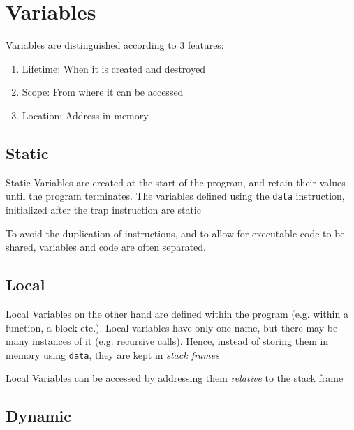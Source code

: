 \documentclass[english,course]{Notes}
\newcommand{\ita}[1]{\textit{#1}}
\newcommand{\code}{\texttt}
\begin{document}
\section{Variables}

\par{Variables are distinguished according to 3 features:}
\begin{enumerate}
	\item Lifetime: When it is created and destroyed
	\item Scope: From where it can be accessed
	\item Location: Address in memory
\end{enumerate}

\subsection{Static}

\par{Static Variables are created at the start of the program, and retain their values until the program terminates. The variables defined using the \code{data} instruction, initialized after the trap instruction are static}

\par{To avoid the duplication of instructions, and to allow for executable code to be shared, variables and code are often separated.}


\subsection{Local}

\par{Local Variables on the other hand are defined within the program (e.g. within a function, a block etc.). Local variables have only one name, but there may be many instances of it (e.g. recursive calls). Hence, instead of storing them in memory using \code{data}, they are kept in \ita{stack frames}}

\par{Local Variables can be accessed by addressing them \ita{relative} to the stack frame}

\subsection{Dynamic}
\end{document}
